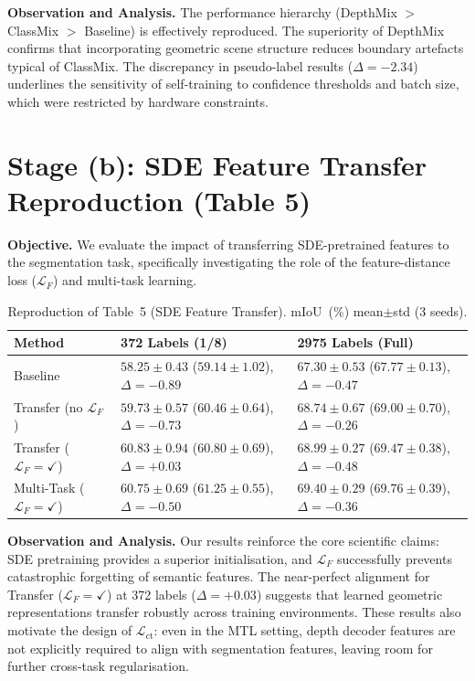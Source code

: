 \noindent
\textbf{Observation and Analysis.} The performance hierarchy
(DepthMix $>$ ClassMix $>$ Baseline) is effectively reproduced. The
superiority of DepthMix confirms that incorporating geometric scene
structure reduces boundary artefacts typical of ClassMix. The discrepancy
in pseudo-label results ($\Delta = -2.34$) underlines the sensitivity of
self-training to confidence thresholds and batch size, which were
restricted by hardware constraints.

\section{Stage (b): SDE Feature Transfer Reproduction (Table 5)}
\label{sec:stage_ab_table5}

\noindent
\textbf{Objective.} We evaluate the impact of transferring SDE-pretrained
features to the segmentation task, specifically investigating the role of
the feature-distance loss ($\mathcal{L}_F$) and multi-task learning.

\begin{table}[H]
\centering
\caption{Reproduction of Table~5 (SDE Feature Transfer). mIoU~(\%)
mean$\pm$std (3 seeds).}
\label{tab:table5_repro}
\renewcommand{\arraystretch}{1.2}
\begin{tabularx}{\textwidth}{lXX}
\toprule
\textbf{Method} &
\textbf{372 Labels (1/8)} &
\textbf{2975 Labels (Full)} \\
\midrule
Baseline &
$58.25 \pm 0.43$ {\scriptsize ($59.14 \pm 1.02$), $\Delta=-0.89$} &
$67.30 \pm 0.53$ {\scriptsize ($67.77 \pm 0.13$), $\Delta=-0.47$} \\
Transfer (no $\mathcal{L}_F$) &
$59.73 \pm 0.57$ {\scriptsize ($60.46 \pm 0.64$), $\Delta=-0.73$} &
$68.74 \pm 0.67$ {\scriptsize ($69.00 \pm 0.70$), $\Delta=-0.26$} \\
Transfer ($\mathcal{L}_F=\checkmark$) &
$60.83 \pm 0.94$ {\scriptsize ($60.80 \pm 0.69$), $\Delta=+0.03$} &
$68.99 \pm 0.27$ {\scriptsize ($69.47 \pm 0.38$), $\Delta=-0.48$} \\
Multi-Task ($\mathcal{L}_F=\checkmark$) &
$60.75 \pm 0.69$ {\scriptsize ($61.25 \pm 0.55$), $\Delta=-0.50$} &
$69.40 \pm 0.29$ {\scriptsize ($69.76 \pm 0.39$), $\Delta=-0.36$} \\
\bottomrule
\end{tabularx}
\end{table}

\noindent
\textbf{Observation and Analysis.} Our results reinforce the core
scientific claims: SDE pretraining provides a superior initialisation,
and $\mathcal{L}_F$ successfully prevents catastrophic forgetting of
semantic features. The near-perfect alignment for Transfer
($\mathcal{L}_F=\checkmark$) at 372 labels ($\Delta = +0.03$) suggests
that learned geometric representations transfer robustly across training
environments. These results also motivate the design of
$\mathcal{L}_\text{ct}$: even in the MTL setting, depth decoder features
are not explicitly required to align with segmentation features, leaving
room for further cross-task regularisation.

